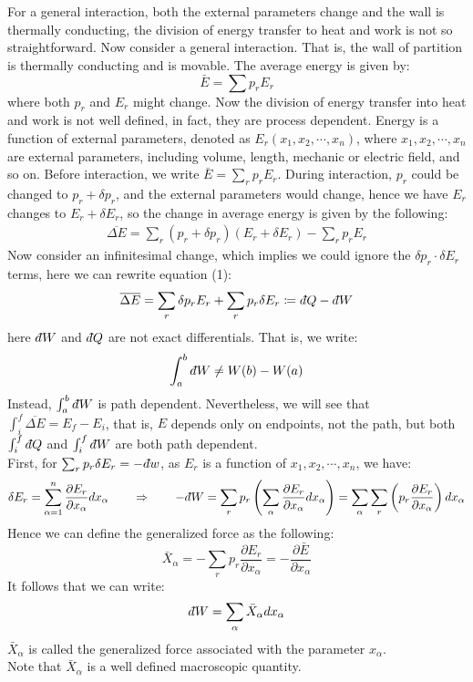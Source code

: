 \documentclass[11pt,oneside]{book}
\theoremstyle{break}
\theoremstyle{break}
\newcommand{\dbar}{d\hspace*{-0.08em}\bar{}\hspace*{0.1em}}
\begin{document}
For a general interaction, both the external parameters change and the wall is thermally conducting, the division of energy transfer to heat and work is not so straightforward. Now consider a general interaction. That is, the wall of partition is thermally conducting and is movable. The average energy is given by:
$$\bar{E} = \sum p_r E_r$$
where both $p_r$ and $E_r$ might change. Now the division of energy transfer into heat and work is not well defined, in fact, they are process dependent. Energy is a function of external parameters, denoted as $E_r(x_1,x_2,\cdots, x_n)$, where $x_1,x_2,\cdots, x_n$ are external parameters, including volume, length, mechanic or electric field, and so on. Before interaction, we write $\bar{E} = \sum_r p_r E_r$. During interaction, $p_r$ could be changed to $p_r + \delta p_r$, and the external parameters would change, hence we have $E_r$ changes to $E_r + \delta E_r$, so the change in average energy is given by the following:
\begin{align*}
\overline{\Delta E} = \sum_r (p_r +\delta p_r)(E_r+\delta E_r) - \sum_r p_r E_r \tag{1}
\end{align*}
Now consider an infinitesimal change, which implies we could ignore the $\delta p_r \cdot \delta E_r$ terms, here we can rewrite equation (1):
\begin{align*}
\overline{\Delta E} = \sum_r \delta p_r E_r + \sum_r p_r \delta E_r \coloneqq \dbar Q -\dbar W
\end{align*}
here $\dbar W$ and $\dbar Q$ are not exact differentials. That is, we write:
$$\int_a^b \dbar W \neq W(b)-W(a)$$ 
Instead, $\int_a^b \dbar W$ is path dependent. Nevertheless, we will see that $\int_i^f \overline{ \Delta E} = E_f - E_i$, that is, $E$ depends only on endpoints, not the path, but both $\int_i^f \dbar Q$ and $\int_i^f \dbar W$ are both path dependent. \\


First, for $\sum_r p_r \delta E_r = -\dbar w$, as $E_r$ is a function of $x_1,x_2,\cdots, x_n$, we have:
\begin{align*}
\delta E_r = \sum_{\alpha=1}^n \frac{\partial E_r}{\partial x_{\alpha}}dx_{\alpha} \qquad \Rightarrow \qquad -\dbar W = \sum_r p_r \left(\sum_{\alpha} \frac{\partial E_r}{\partial x_{\alpha}}dx_{\alpha}\right) = \sum_{\alpha}\sum_r\left( p_r\frac{\partial E_r}{\partial x_{\alpha}}\right)dx_{\alpha}
\end{align*}
Hence we can define the generalized force as the following: 
$$\bar{X}_{\alpha} = -\sum_r p_r \frac{\partial E_r}{\partial x_{\alpha}} = -\frac{\partial \bar{E}}{\partial x_{\alpha}}$$
It follows that we can write: 
$$\dbar W = \sum_{\alpha} \bar{X}_{\alpha} dx_{\alpha}$$
$\bar{X}_{\alpha}$ is called the generalized force associated with the parameter $x_{\alpha}$. \\
Note that $\bar{X}_{\alpha}$ is a well defined macroscopic quantity.\\
\end{document}
